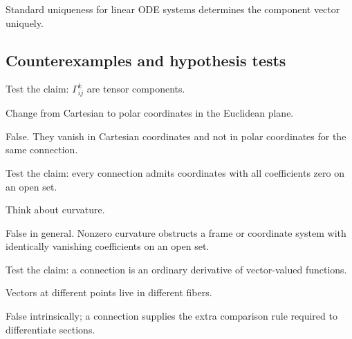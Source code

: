 \begin{solution}
Standard uniqueness for linear ODE systems determines the component vector uniquely.
\end{solution}

\subsection*{Counterexamples and hypothesis tests}

\begin{exercise}\label{exr:vii21-ped-10}
Test the claim: \(\Gamma^k_{ij}\) are tensor components.
\end{exercise}

\begin{hint}
Change from Cartesian to polar coordinates in the Euclidean plane.
\end{hint}

\begin{solution}
False.  They vanish in Cartesian coordinates and not in polar coordinates for the same connection.
\end{solution}

\begin{exercise}\label{exr:vii21-ped-11}
Test the claim: every connection admits coordinates with all coefficients zero on an open set.
\end{exercise}

\begin{hint}
Think about curvature.
\end{hint}

\begin{solution}
False in general.  Nonzero curvature obstructs a frame or coordinate system with identically vanishing coefficients on an open set.
\end{solution}

\begin{exercise}\label{exr:vii21-ped-12}
Test the claim: a connection is an ordinary derivative of vector-valued functions.
\end{exercise}

\begin{hint}
Vectors at different points live in different fibers.
\end{hint}

\begin{solution}
False intrinsically; a connection supplies the extra comparison rule required to differentiate sections.
\end{solution}

